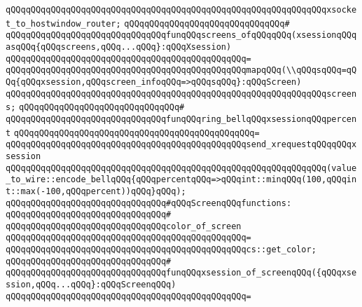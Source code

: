 \verb|qQQqqQQqqQQqqQQqqQQqqQQqqQQqqQQqqQQqqQQqqQQqqQQqqQQqqQQqqQQqqQQqxsocket_to_hostwindow_router;|\newline
\newline
\verb|qQQqqQQqqQQqqQQqqQQqqQQqqQQqqQQq#|\newline
\verb|qQQqqQQqqQQqqQQqqQQqqQQqqQQqqQQqfunqQQqscreens_ofqQQqqQQq(xsessionqQQqasqQQq{qQQqscreens,qQQq...qQQq}:qQQqXsession)|\newline
\verb|qQQqqQQqqQQqqQQqqQQqqQQqqQQqqQQqqQQqqQQqqQQqqQQq=|\newline
\verb|qQQqqQQqqQQqqQQqqQQqqQQqqQQqqQQqqQQqqQQqqQQqqQQqmapqQQq(\\qQQqsqQQq=qQQq{qQQqxsession,qQQqscreen_infoqQQq=>qQQqsqQQq}:qQQqScreen)|\newline
\verb|qQQqqQQqqQQqqQQqqQQqqQQqqQQqqQQqqQQqqQQqqQQqqQQqqQQqqQQqqQQqqQQqscreens;|\newline
\newline
\verb|qQQqqQQqqQQqqQQqqQQqqQQqqQQqqQQq#|\newline
\verb|qQQqqQQqqQQqqQQqqQQqqQQqqQQqqQQqfunqQQqring_bellqQQqxsessionqQQqpercent|\newline
\verb|qQQqqQQqqQQqqQQqqQQqqQQqqQQqqQQqqQQqqQQqqQQqqQQq=|\newline
\verb|qQQqqQQqqQQqqQQqqQQqqQQqqQQqqQQqqQQqqQQqqQQqqQQqsend_xrequestqQQqqQQqxsession|\newline
\verb|qQQqqQQqqQQqqQQqqQQqqQQqqQQqqQQqqQQqqQQqqQQqqQQqqQQqqQQqqQQqqQQq(value_to_wire::encode_bellqQQq{qQQqpercentqQQq=>qQQqint::minqQQq(100,qQQqint::max(-100,qQQqpercent))qQQq}qQQq);|\newline
\newline
\newline
\verb|qQQqqQQqqQQqqQQqqQQqqQQqqQQqqQQq#qQQqScreenqQQqfunctions:|\newline
\verb|qQQqqQQqqQQqqQQqqQQqqQQqqQQqqQQq#|\newline
\verb|qQQqqQQqqQQqqQQqqQQqqQQqqQQqqQQqcolor_of_screen|\newline
\verb|qQQqqQQqqQQqqQQqqQQqqQQqqQQqqQQqqQQqqQQqqQQqqQQq=|\newline
\verb|qQQqqQQqqQQqqQQqqQQqqQQqqQQqqQQqqQQqqQQqqQQqqQQqcs::get_color;|\newline
\verb|qQQqqQQqqQQqqQQqqQQqqQQqqQQqqQQq#|\newline
\verb|qQQqqQQqqQQqqQQqqQQqqQQqqQQqqQQqfunqQQqxsession_of_screenqQQq({qQQqxsession,qQQq...qQQq}:qQQqScreenqQQq)|\newline
\verb|qQQqqQQqqQQqqQQqqQQqqQQqqQQqqQQqqQQqqQQqqQQqqQQq=|\newline
